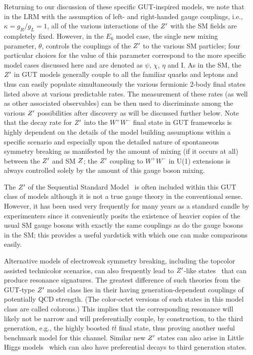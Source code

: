 Returning to our discussion of these specific GUT-inspired models, we note that in the LRM with the assumption of left- and right-handed gauge couplings, i.e., $\kappa=g_R/g_L=1$, 
all of the various interactions of the $Z^{\prime}$ with the SM fields are completely fixed. However, in the $E_6$ model case, the 
single new mixing parameter, $\theta$, controls the couplings of the $Z^{\prime}$ to the various SM particles; four particular choices for the value of this parameter correspond to the more 
specific model cases discussed here and are denoted as $\psi$, $\chi$, $\eta$ and I. As in the SM, the $Z^{\prime}$ in GUT models generally couple to all the familiar quarks and leptons and 
thus can easily populate simultaneously the various fermionic 2-body final states listed above at various predictable rates. The measurement of these rates (as well as other associated 
observables) can be then used to discriminate among the various $Z^{\prime}$ possibilities after discovery as will be discussed further below. Note that the decay rate for $Z^{\prime}$ into the 
$W^+W^-$ final state in GUT frameworks is highly dependent on the details of the model building assumptions within a specific scenario and especially upon the detailed nature 
of spontaneous symmetry breaking as manifested by the amount of mixing (if it occurs at all) between the $Z^{\prime}$ and SM $Z$; the $Z^{\prime}$ coupling to $W^+W^-$ in U(1) extensions is 
always controlled solely by the amount of this gauge boson mixing.  

The $Z^{\prime}$ of the Sequential Standard Model~\cite{Altarelli:1989ff} is often included within this GUT class of models although it is not a true gauge theory in the conventional sense. 
However, it has been used very frequently for many years as a standard candle by experimenters since it conveniently posits the existence of heavier copies of the usual SM gauge bosons 
with exactly the same couplings as do the gauge bosons in the SM; this provides a useful yardstick with which one can make comparisons easily. 

Alternative models of electroweak symmetry breaking, including the topcolor assisted technicolor scenarios, can also frequently lead to $Z^{\prime}$-like states~\cite{Hill:1994hp}
that can produce resonance signatures. The greatest difference of such theories from the GUT-type $Z^{\prime}$ model class lies in their having generation-dependent couplings of 
potentially QCD strength. (The color-octet versions of such states in this model class are called colorons.) This implies that the corresponding resonance will likely not be narrow and 
will preferentially couple, by construction, to the 
third generation, e.g., the highly boosted $t\bar t$ final state, thus proving another useful benchmark model for this channel. Similar new $Z^{\prime}$ states can also arise in Little Higgs 
models~\cite{ArkaniHamed:2001nc} which can also have preferential decays to third generation states. 

